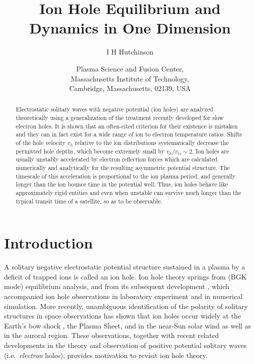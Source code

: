 \documentclass[aip,pop,article-title]{revtex4-2}
\def\affiliation#1{\date{\normalsize #1}}
\begin{document}
\title{Ion Hole Equilibrium and Dynamics in One Dimension}
\author{I H Hutchinson}
\affiliation{Plasma Science and Fusion Center,\\ Massachusetts Institute of
  Technology,\\ Cambridge, Massachusetts, 02139, USA}

\ifx\altaffiliation\undefined\maketitle\fi %
\begin{abstract}
  Electrostatic solitary waves with negative potential (ion holes) are
  analyzed theoretically using a generalization of the treatment
  recently developed for slow electron holes. It is shown that an
  often-cited criterion for their existence is mistaken and they can
  in fact exist for a wide range of ion to electron temperature
  ratios. Shifts of the hole velocity $v_h$ relative to the ion
  distributions systematically decrease the permitted hole depths,
  which become extremely small by $v_h/v_{ti}\sim 2$. Ion holes are
  usually unstably accelerated by electron reflection forces which are
  calculated numerically and analytically for the resulting asymmetric
  potential structure. The timescale of this acceleration is
  proportional to the ion plasma period, and generally longer than the
  ion bounce time in the potential well. Thus, ion holes behave like
  approximately rigid entities and even when unstable can survive much
  longer than the typical transit time of a satellite, so as to be observable.
\end{abstract}
\ifx\altaffiliation\undefined\else\maketitle\fi  %

\section{Introduction}

A solitary negative electrostatic potential structure sustained in a
plasma by a deficit of trapped ions is called an ion hole. Ion hole
theory springs from \citeauthor{Bernstein1957} (BGK mode) equilibrium
analysis\cite{Bernstein1957}, and from its subsequent development
\cite{Bujarbarua1981,Schamel1982,Dupree1982}, which accompanied ion
hole observations in laboratory experiment
\cite{Pecseli1981,Johnsen1987} and in numerical
simulation\cite{Sakanaka1972,Pecseli1984,Berman1985,Goldman2003}. More
recently, unambiguous identification of the polarity of solitary
structures in space observations has shown that ion holes occur widely
at the Earth's bow shock \cite{Wang2021}, the Plasma
Sheet\cite{Wang2022}, and in the near-Sun solar wind\cite{Mozer2021}
as well as in the auroral region\cite{Bounds1999}. These observations,
together with recent related developments in the theory and
observation of positive potential solitary waves (i.e.\
\emph{electron} holes)\cite{Hutchinson2016,Hutchinson2017}, provides
motivation to revisit ion hole theory.
\end{document}
